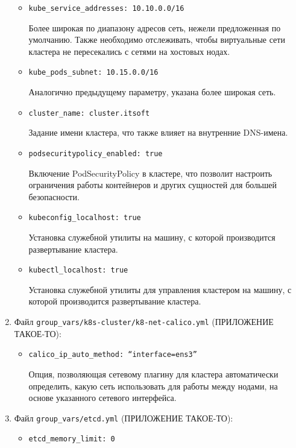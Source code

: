 \begin{enumerate}
\begin{itemize}
            \item \texttt{kube\_service\_addresses: 10.10.0.0/16}

                Более широкая по диапазону адресов сеть, нежели предложенная по умолчанию. Также необходимо отслеживать, чтобы виртуальные сети кластера не пересекались с сетями на хостовых нодах.

            \item \texttt{kube\_pods\_subnet: 10.15.0.0/16}

                Аналогично предыдущему параметру, указана более широкая сеть.

            \item \texttt{cluster\_name: cluster.itsoft}

                Задание имени кластера, что также влияет на внутренние DNS-имена.

            \item \texttt{podsecuritypolicy\_enabled: true}

                Включение PodSecurityPolicy в кластере, что позволит настроить ограничения работы контейнеров и других сущностей для большей безопасности.

            \item \texttt{kubeconfig\_localhost: true}

                Установка служебной утилиты на машину, с которой производится развертывание кластера.

            \item \texttt{kubectl\_localhost: true}

                Установка служебной утилиты для управления кластером на машину, с которой производится развертывание кластера.

        \end{itemize}
    \item Файл \texttt{group\_vars/k8s-cluster/k8-net-calico.yml} (ПРИЛОЖЕНИЕ ТАКОЕ-ТО):
        \begin{itemize}
            \item \texttt{calico\_ip\_auto\_method: “interface=ens3”}

                Опция, позволяющая сетевому плагину для кластера автоматически определить, какую сеть использовать для работы между нодами, на основе указанного сетевого интерфейса.

        \end{itemize}
    \item Файл \texttt{group\_vars/etcd.yml} (ПРИЛОЖЕНИЕ ТАКОЕ-ТО):
        \begin{itemize}
            \item \texttt{etcd\_memory\_limit: 0}


\end{itemize}
\end{enumerate}
